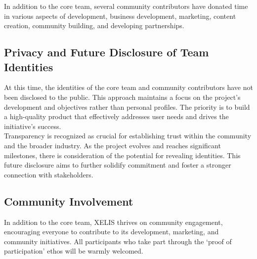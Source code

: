 \documentclass[10pt,a4paper,twocolumn]{article}
\begin{document}
In addition to the core team, several community contributors have donated time in various aspects of development, business development, marketing, content creation, community building, and developing partnerships. 

\subsection{Privacy and Future Disclosure of Team Identities}

At this time, the identities of the core team and community contributors have not been disclosed to the public. This approach maintains a focus on the project’s development and objectives rather than personal profiles. The priority is to build a high-quality product that effectively addresses user needs and drives the initiative's success.\\

Transparency is recognized as crucial for establishing trust within the community and the broader industry. As the project evolves and reaches significant milestones, there is consideration of the potential for revealing identities. This future disclosure aims to further solidify commitment and foster a stronger connection with stakeholders.

\subsection{Community Involvement}
In addition to the core team, XELIS thrives on community engagement, encouraging everyone to contribute to its development, marketing, and community initiatives. All participants who take part through the ‘proof of participation’ ethos will be warmly welcomed.
\end{document}
